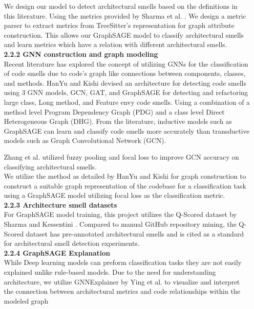 We design our model to detect architectural smells based on the definitions in this literature.
Using the metrics provided by Sharma et al. \cite{Sharma2020}.
We design a metric parser to extract metrics from TreeSitter's
representation for graph attribute construction. This allows our GraphSAGE model
to classify architectural smells and learn metrics which have a relation with different
architectural smells.
\\

\textbf{2.2.2 GNN construction and graph modeling}
\\

Recent literature has explored the concept of utilizing GNNs for the classification of code smells
due to code's graph like connections between components, classes, and methods.
HanYu and Kishi \cite{HanYu2024} devised an architecture for detecting code smells using 3 GNN models, GCN, GAT, and
GraphSAGE for detecting and refactoring large class, Long method, and Feature envy code smells. 
Using a combination of a method level Program Dependency Graph (PDG) and a class level Direct Heterogeneous Graph (DHG).
From the literature, inductive models such as GraphSAGE can learn and classify code smells more accurately 
than transductive models such as Graph Convolutional Network (GCN).

Zhang et al. \cite{ZHANG2025103284} utilized fuzzy pooling and focal loss to improve GCN accuracy on classifying architectural smells.
\\

We utilize the method as detailed by HanYu and Kishi \cite{HanYu2024}
for graph construction to construct a suitable graph representation of the codebase
for a classification task using a GraphSAGE model utilizing focal loss as the classification metric.
\\

\textbf{2.2.3 Architecture smell datasets}
\\

For GraphSAGE model training, this project utilizes the Q-Scored dataset by Sharma and Kessentini \cite{Sharma2021}. 
Compared to manual GitHub repository mining, the Q-Scored dataset has pre-annotated architectural smells
and is cited as a standard for architectural smell detection experiments.
\\

\textbf{2.2.4 GraphSAGE Explanation}
\\

While Deep learning models can preform classification tasks they are not easily explained unlike rule-based models.
Due to the need for understanding architecture, we utilize GNNExplainer by Ying et al. \cite{Ying2019} to visualize and interpret
the connection between architectural metrics and code relationships within the modeled graph
\\

